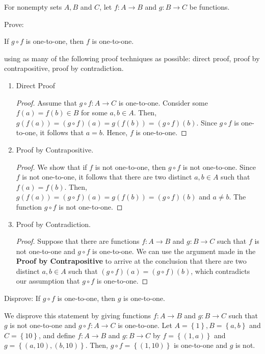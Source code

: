 \documentclass[12pt]{article}
\newenvironment{problem}[2][Problem]{\begin{trivlist} \item[\hskip \labelsep {\bfseries #1}\hskip \labelsep {\bfseries #2.}]}{\end{trivlist}}
\newenvironment{solution}[1][Solution]{\begin{trivlist} \item[\hskip \labelsep {\bfseries #1}]}{\end{trivlist}}
\begin{document}
    \begin{problem}{43}
      For nonempty sets $A, B$ and $C$, let $f:A\to B$ and $g:B\to C$ be functions.
    \begin{enumerate}
      \item Prove:
    \begin{center}
      If $g\circ f$ is one-to-one, then $f$ is one-to-one. 
    \end{center}
    using as many of the following proof techniques as possible: direct proof, proof by contrapositive, proof by contradiction.
    \begin{solution}
      \begin{enumerate}[label=(\roman*)]
      \item Direct Proof
    \begin{proof}
      Assume that $g\circ f: A\to C$ is one-to-one. Consider some $f(a)=f(b)\in B$ for some $a,b\in A$. Then, $g(f(a)) = (g\circ f)(a) = g(f(b)) = (g\circ f)(b)$. Since $g\circ f$ is one-to-one, it follows that $a=b$. Hence, $f$ is one-to-one.  
    \end{proof}
      \item Proof by Contrapositive.
    \begin{proof}
      We show that if $f$ is not one-to-one, then $g\circ f$ is not one-to-one. Since $f$ is not one-to-one, it follows that there are two distinct $a,b\in A$ such that $f(a) = f(b)$. Then, $g(f(a)) = (g\circ f)(a) = g(f(b)) = (g\circ f)(b)$ and $a\neq b$. The function $g\circ f$ is not one-to-one.
    \end{proof}
      \item Proof by Contradiction.
    \begin{proof}
      Suppose that there are functions $f:A\to B$ and $g:B\to C$ such that $f$ is not one-to-one and $g\circ f$ is one-to-one. We can use the argument made in the \textbf{Proof by Contrapositive} to arrive at the conclusion that there are two distinct $a,b\in A$ such that $(g\circ f)(a) = (g\circ f)(b)$, which contradicts our assumption that $g\circ f$ is one-to-one.
    \end{proof}
    \end{enumerate}
    \end{solution}
  \item Disprove: If $g\circ f$ is one-to-one, then $g$ is one-to-one.
    \begin{solution}
      We disprove this statement by giving functions $f:A\to B$ and $g:B\to C$ such that $g$ is not one-to-one and $g\circ f: A\to C$ is one-to-one. Let $A=\left\{ 1 \right\}, B=\left\{ a,b \right\}$ and $C=\left\{ 10 \right\}$, and define $f:A\to B$ and $g:B\to C$ by $f=\left\{ (1,a) \right\}$ and $g=\left\{ (a,10),(b,10) \right\}$. Then, $g\circ f = \left\{ (1,10) \right\}$ is one-to-one and $g$ is not.
    \end{solution}
    \end{enumerate}
    \end{problem}
\end{document}
